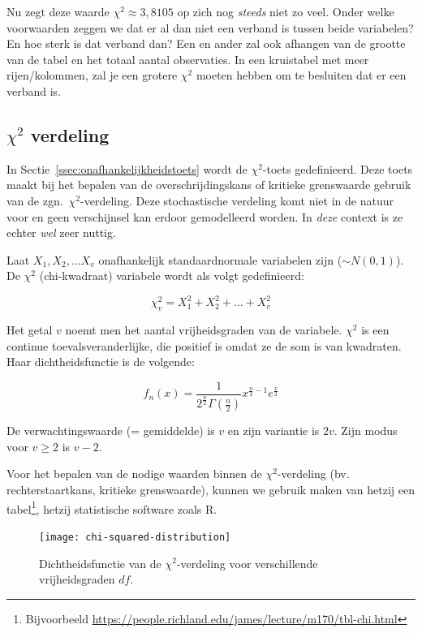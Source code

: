 Nu zegt deze waarde $\chi^2 \approx 3,8105$ op zich nog \emph{steeds} niet zo veel. Onder welke voorwaarden zeggen we dat er al dan niet een verband is tussen beide variabelen? En hoe sterk is dat verband dan? Een en ander zal ook afhangen van de grootte van de tabel en het totaal aantal observaties. In een kruistabel met meer rijen/kolommen, zal je een grotere $\chi^2$ moeten hebben om te besluiten dat er een verband is.

\subsection[Chi-kwadraatverdeling]{$\chi^{2}$ verdeling}
\label{ssec:chi-kwadraatverdeling}

In Sectie~\ref{ssec:onafhankelijkheidstoets} wordt de $\chi^2$-toets gedefinieerd. Deze toets maakt bij het bepalen van de overschrijdingskans of kritieke grenswaarde gebruik van de zgn.~$\chi^2$-verdeling. Deze stochastische verdeling komt niet in de natuur voor en geen verschijnsel kan erdoor gemodelleerd worden. In \emph{deze} context is ze echter \emph{wel} zeer nuttig.

Laat $X_{1}, X_{2}, \dots X_{v}$ onafhankelijk standaardnormale variabelen zijn ($\sim N(0,1)$). De $\chi^{2}$ (chi-kwadraat) variabele wordt als volgt gedefinieerd:

\[ \chi^{2}_{v} = X_{1}^{2} + X_{2}^{2} + \dots + X_{v}^{2} \]

Het getal $v$ noemt men het aantal vrijheidsgraden van de variabele. $\chi^{2}$ is een continue toevalsveranderlijke, die positief is omdat ze de som is van kwadraten. Haar dichtheidsfunctie is de volgende:

\[ f_{n}(x) = \frac{1}{2^{\frac{n}{2}}\Gamma(\frac{n}{2})} x^{\frac{n}{2} -1} e^{\frac{x}{2}} \]

De verwachtingswaarde (= gemiddelde) is $v$ en zijn variantie is $2v$. Zijn modus voor $v \geq 2$ is $v-2$.

Voor het bepalen van de nodige waarden binnen de $\chi^2$-verdeling (bv. rechterstaartkans, kritieke grenswaarde), kunnen we gebruik maken van hetzij een tabel\footnote{Bijvoorbeeld \url{https://people.richland.edu/james/lecture/m170/tbl-chi.html}}, hetzij statistische software zoals R.

\begin{figure}
  \texttt{[image: chi-squared-distribution]}
  \caption{Dichtheidsfunctie van de $\chi^2$-verdeling voor verschillende vrijheidsgraden $df$.}
  \label{fig:chi-squared-distribution}
\end{figure}

